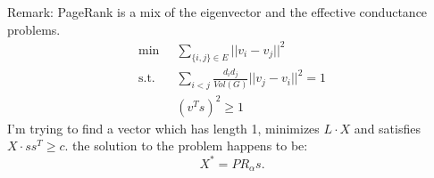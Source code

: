 \documentclass[11pt]{article}
\begin{document}
Remark: PageRank is a mix of the eigenvector and the effective conductance problems. 
\begin{align*}
    \min \;&\;\sum_{\{i,j\}\in E} ||v_i - v_j||^2\\
    \text{s.t.}\; &\; \sum_{i < j}\frac{d_id_j}{Vol(G)}||v_j - v_i||^2 = 1\\
    & \; (v^Ts)^2\geq 1
\end{align*}
I'm trying to find a vector which has length 1, minimizes $L\cdot X$ and satisfies $X \cdot ss^T \geq c$. the solution to the problem happens to be:
\[
    X^* = PR_{\alpha}s.
\]
\end{document}
